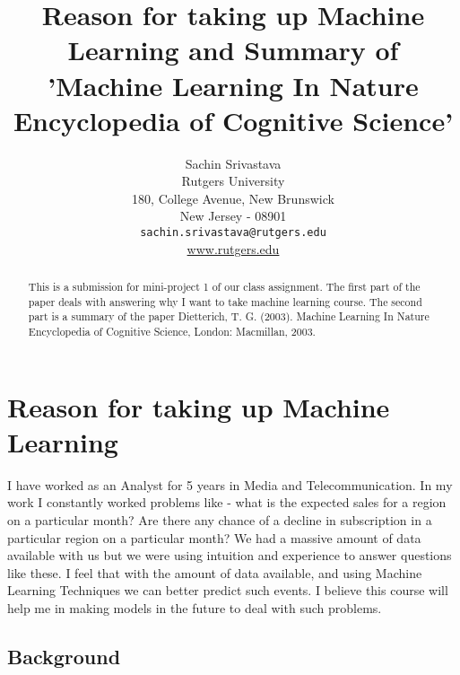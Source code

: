 \documentclass[10pt,onecolumn,letterpaper]{article}
\begin{document}
\title{Reason for taking up Machine Learning and Summary of 'Machine Learning In Nature Encyclopedia of Cognitive Science'}

\author{Sachin Srivastava\\
Rutgers University\\
180, College Avenue, New Brunswick\\
New Jersey - 08901\\
{\tt\small sachin.srivastava@rutgers.edu}\\
{\small\url{www.rutgers.edu}}
}

\maketitle

\begin{abstract}
   This is a submission for mini-project 1 of our class assignment. The first part of the paper deals with answering why I want to take machine learning course. The second part is a summary of the paper Dietterich, T. G. (2003). Machine Learning In Nature Encyclopedia of Cognitive Science, London: Macmillan, 2003.
\end{abstract}

\section{Reason for taking up Machine Learning}

I have worked as an Analyst for 5 years in Media and Telecommunication. In my work I constantly worked problems like - what is the expected sales for a region on a particular month? Are there any chance of a decline in subscription in a particular region on a particular month? We had a massive amount of data available with us but we were using intuition and experience to answer questions like these. I feel that with the amount of data available, and using Machine Learning Techniques we can better predict such events. I believe this course will help me in making models in the future to deal with such problems.

\subsection{Background}
\end{document}
